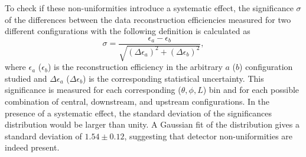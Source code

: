 \documentclass[a4paper,11pt]{article}
\begin{document}
To check if these non-uniformities introduce a systematic effect, the significance $\sigma$ of the differences between the data reconstruction efficiencies measured for two different configurations with the following definition is calculated as
\begin{equation}
\sigma = \frac{\epsilon_a-\epsilon_b}{\sqrt{(\Delta \epsilon_{a})^2 + (\Delta \epsilon_b)^2}},
\end{equation}
where $\epsilon_{a}$ ($\epsilon_{b}$) is the reconstruction efficiency in the arbitrary $a$ ($b$) configuration studied and $\Delta \epsilon_{a}$ ($\Delta \epsilon_{b}$) is the corresponding statistical uncertainty. This significance is measured for each corresponding ($\theta,\phi,L$) bin and for each possible combination of central, downstream, and upstream configurations. In the presence of a systematic effect, the standard deviation of the significances distribution would be larger than unity. A Gaussian fit of the distribution gives a standard deviation of $1.54\pm0.12$, suggesting that detector non-uniformities are indeed present.


\end{document}
